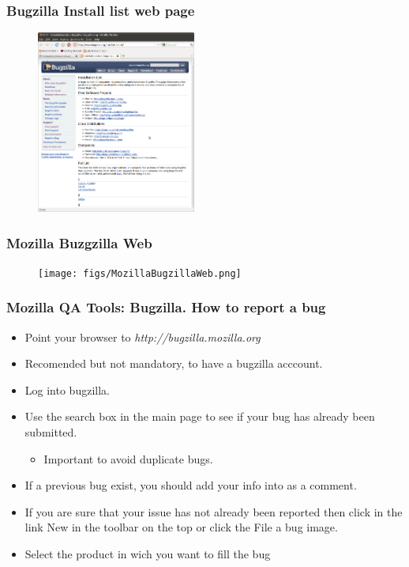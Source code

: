 \documentclass{beamer}
\begin{document}
\begin{frame}
\frametitle{Bugzilla Install list web page}
\begin{center}
\begin{figure}
 \includegraphics[height=6cm]{figs/Bugzilla_Install_List.png}
\end{figure}
\end{center}
\end{frame}


\begin{frame}
\frametitle{Mozilla Buzgzilla Web}
\begin{center}
\begin{figure}
 \texttt{[image: figs/MozillaBugzillaWeb.png]}
\end{figure}
\end{center}
\end{frame}


\begin{frame}
 \frametitle{Mozilla QA Tools: Bugzilla. How to report a bug}
 \begin{itemize}
    \item Point your browser to \textit{http://bugzilla.mozilla.org}
    \item Recomended but not mandatory, to have a bugzilla acccount.
    \item Log into bugzilla.
    \item Use the search box in the main page to see if your bug has already been submitted.
    \begin{itemize}
       \item Important to avoid duplicate bugs.
    \end{itemize}
    \item If a previous bug exist, you should add your info into as a comment.
    \item If you are sure that your issue has not already been reported then click in the link New in the toolbar on the top or click the File a bug image.
    \item Select the product in wich you want to fill the bug
 \end{itemize}
\end{frame}
\end{document}
